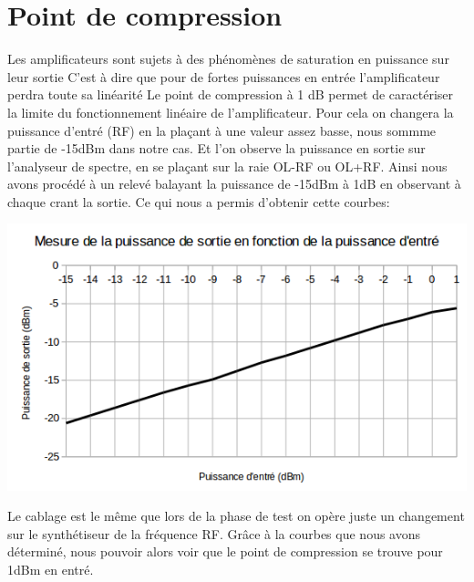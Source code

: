 \documentclass[a4paper,12pt]{report}            %
\begin{document}
\section{Point de compression}
Les amplificateurs sont sujets à des phénomènes de saturation en puissance sur leur sortie
C'est à dire que pour de fortes puissances en entrée l'amplificateur perdra toute sa linéarité
Le point de compression à 1 dB permet de caractériser la limite du fonctionnement linéaire de l'amplificateur. 
Pour cela on changera la puissance d'entré (RF) en la plaçant à une valeur assez basse, nous sommme partie de 
-15dBm dans notre cas. Et l'on observe la puissance en sortie sur l'analyseur de spectre, en se plaçant sur la raie OL-RF ou OL+RF.
Ainsi nous avons procédé à un relevé balayant la puissance de -15dBm à 1dB en observant à chaque crant la sortie.
Ce qui nous a permis d'obtenir cette courbes:
\begin{center}\includegraphics[scale = 0.7]{pic/graph_pout.png}\\ \end{center}
Le cablage est le même que lors de la phase de test on opère juste un changement sur le synthétiseur de la fréquence RF.
Grâce à la courbes que nous avons déterminé, nous pouvoir alors voir que le point de compression se trouve pour 1dBm en entré.
\end{document}
